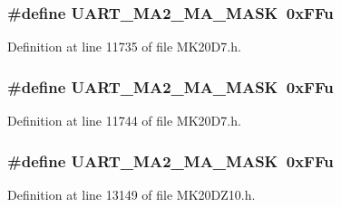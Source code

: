 \subsubsection[{\texorpdfstring{U\+A\+R\+T\+\_\+\+M\+A2\+\_\+\+M\+A\+\_\+\+M\+A\+SK}{UART_MA2_MA_MASK}}]{\setlength{\rightskip}{0pt plus 5cm}\#define U\+A\+R\+T\+\_\+\+M\+A2\+\_\+\+M\+A\+\_\+\+M\+A\+SK~0x\+F\+Fu}\hypertarget{group___u_a_r_t___register___masks_ga700f51ab869350daee42b8ae9c655ffd}{}\label{group___u_a_r_t___register___masks_ga700f51ab869350daee42b8ae9c655ffd}


Definition at line 11735 of file M\+K20\+D7.\+h.

\subsubsection[{\texorpdfstring{U\+A\+R\+T\+\_\+\+M\+A2\+\_\+\+M\+A\+\_\+\+M\+A\+SK}{UART_MA2_MA_MASK}}]{\setlength{\rightskip}{0pt plus 5cm}\#define U\+A\+R\+T\+\_\+\+M\+A2\+\_\+\+M\+A\+\_\+\+M\+A\+SK~0x\+F\+Fu}\hypertarget{group___u_a_r_t___register___masks_ga700f51ab869350daee42b8ae9c655ffd}{}\label{group___u_a_r_t___register___masks_ga700f51ab869350daee42b8ae9c655ffd}


Definition at line 11744 of file M\+K20\+D7.\+h.

\subsubsection[{\texorpdfstring{U\+A\+R\+T\+\_\+\+M\+A2\+\_\+\+M\+A\+\_\+\+M\+A\+SK}{UART_MA2_MA_MASK}}]{\setlength{\rightskip}{0pt plus 5cm}\#define U\+A\+R\+T\+\_\+\+M\+A2\+\_\+\+M\+A\+\_\+\+M\+A\+SK~0x\+F\+Fu}\hypertarget{group___u_a_r_t___register___masks_ga700f51ab869350daee42b8ae9c655ffd}{}\label{group___u_a_r_t___register___masks_ga700f51ab869350daee42b8ae9c655ffd}


Definition at line 13149 of file M\+K20\+D\+Z10.\+h.

